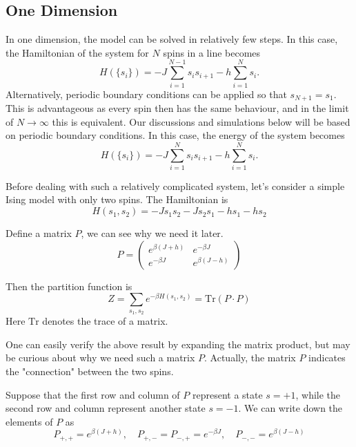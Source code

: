 \documentclass[11pt]{article}
\begin{document}
	\subsection{One Dimension}
	
	In one dimension, the model can be solved in relatively few steps. In this case, the Hamiltonian of the system for $N$ spins in a line becomes
	\begin{equation}
		H(\{s_i\}) = -J \sum_{i=1}^{N-1} s_i s_{i+1} -h\sum_{i=1}^N s_i.
	\end{equation}
	Alternatively, periodic boundary conditions can be applied so that $s_{N+1} = s_1$. This is advantageous as every spin then has the same behaviour, and in the limit of $N \to \infty$ this is equivalent. Our discussions and simulations below will be based on periodic boundary conditions. In this case, the energy of the system becomes
	\begin{equation} \label{eq:Energy1D}
		H(\{s_i\}) = -J \sum_{i=1}^{N} s_i s_{i+1} -h\sum_{i=1}^N s_i.
	\end{equation}

	Before dealing with such a relatively complicated system, let's consider a simple Ising model with only two spins. The Hamiltonian is
	\begin{equation} \label{eq:Hamiltonian1DGeneral2Spins}
		H(s_1, s_2) = -J s_1 s_2 - J s_2 s_1 - hs_1 - hs_2
	\end{equation}

	Define a matrix $P$, we can see why we need it later.
	\begin{equation} \label{eq:MatrixP}
		P = \begin{pmatrix}
			e^{\beta(J+h)} & e^{-\beta J} \\
			e^{-\beta J} & e^{\beta(J-h)}
		\end{pmatrix}
	\end{equation}

	Then the partition function is
	\begin{equation} \label{eq:PartitionFunction1DGeneral2Spins}
		Z = \sum_{s_1, s_2} e^{-\beta H(s_1, s_2)} = \mathrm{Tr}(P \cdot P)
	\end{equation}
	Here $\mathrm{Tr}$ denotes the trace of a matrix.

	One can easily verify the above result by expanding the matrix product, but may be curious about why we need such a matrix $P$. Actually, the matrix $P$ indicates the "connection" between the two spins.

	Suppose that the first row and column of $P$ represent a state $s = +1$, while the second row and column represent another state $s = -1$. We can write down the elements of $P$ as
	\begin{equation} \label{eq:MatrixPElements}
		P_{+,+} = e^{\beta(J+h)}, \quad P_{+,-} = P_{-,+} = e^{-\beta J}, \quad P_{-,-} = e^{\beta(J-h)}
	\end{equation}
\end{document}
